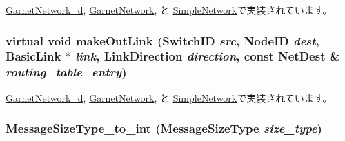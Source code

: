 \hyperlink{classGarnetNetwork__d_a035f37231d3a7edcadd92b7d9e17d4e4}{GarnetNetwork\_\-d}, \hyperlink{classGarnetNetwork_a035f37231d3a7edcadd92b7d9e17d4e4}{GarnetNetwork}, と \hyperlink{classSimpleNetwork_a035f37231d3a7edcadd92b7d9e17d4e4}{SimpleNetwork}で実装されています。\hypertarget{classNetwork_a4e62c2a0e4a511dae2e9870a3d305719}{
\subsubsection[{makeOutLink}]{\setlength{\rightskip}{0pt plus 5cm}virtual void makeOutLink ({\bf SwitchID} {\em src}, \/  {\bf NodeID} {\em dest}, \/  {\bf BasicLink} $\ast$ {\em link}, \/  LinkDirection {\em direction}, \/  const {\bf NetDest} \& {\em routing\_\-table\_\-entry})}}
\label{classNetwork_a4e62c2a0e4a511dae2e9870a3d305719}


\hyperlink{classGarnetNetwork__d_a87915d87a2b4c11ae5f0f4da31bd2375}{GarnetNetwork\_\-d}, \hyperlink{classGarnetNetwork_a87915d87a2b4c11ae5f0f4da31bd2375}{GarnetNetwork}, と \hyperlink{classSimpleNetwork_a87915d87a2b4c11ae5f0f4da31bd2375}{SimpleNetwork}で実装されています。\hypertarget{classNetwork_a0e60f76f594bf5e23a9b0dbcdde63cad}{
\subsubsection[{MessageSizeType\_\-to\_\-int}]{ MessageSizeType\_\-to\_\-int (MessageSizeType {\em size\_\-type})}}
\label{classNetwork_a0e60f76f594bf5e23a9b0dbcdde63cad}



